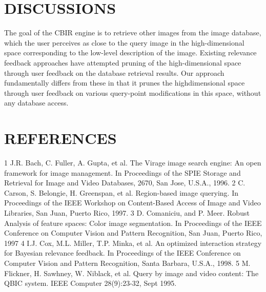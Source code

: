 \documentclass{acmart}
\begin{document}
\newpage
\newpage
{}
\section*{DISCUSSIONS}

The goal of the CBIR engine is to retrieve other images from the image database, which the user perceives as close to the query image in the high-dimensional space corresponding to the low-level description of the image. Existing relevance feedback approaches have attempted pruning of the high-dimensional space through user feedback on the database retrieval results. Our approach fundamentally differs from these in that it prunes the highdimensional space through user feedback on various query-point modifications in this space, without any database access.

\newpage
{}
\section*{REFERENCES}


1	J.R. Bach, C. Fuller, A. Gupta, et al. The Virage image search engine: An open framework for image management. In Proceedings of the SPIE Storage and Retrieval for Image and Video Databases, 2670, San Jose, U.S.A., 1996.
2	C. Carson, S. Belongie, H. Greenspan, et al. Region-based image querying. In Proceedings of the IEEE Workshop on Content-Based Access of Image and Video Libraries, San Juan, Puerto Rico, 1997.
3	D. Comaniciu, and P. Meer. Robust Analysis of feature spaces: Color image segmentation. In Proceedings of the IEEE Conference on Computer Vision and Pattern Recognition, San Juan, Puerto Rico, 1997
4	I.J. Cox, M.L. Miller, T.P. Minka, et al. An optimized interaction strategy for Bayesian relevance feedback. In Proceedings of the IEEE Conference on Computer Vision and Pattern Recognition, Santa Barbara, U.S.A., 1998.
5	M. Flickner, H. Sawhney, W. Niblack, et al. Query by image and video content: The QBIC system. IEEE Computer 28(9):23-32, Sept 1995.
\end{document}
